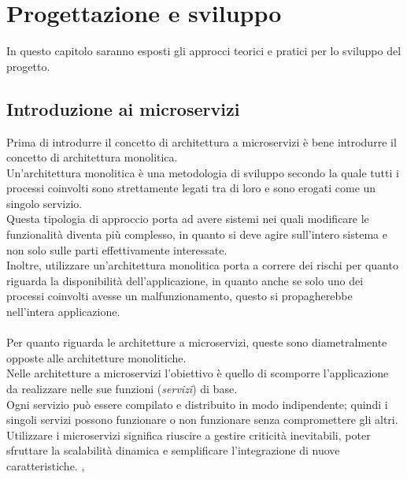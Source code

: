 \chapter{Progettazione e sviluppo}\label{chapter:progettazionesviluppo}
In questo capitolo saranno esposti gli approcci teorici e pratici per lo sviluppo del progetto.


\section{Introduzione ai microservizi}\label{sec:microserviziintro}
Prima di introdurre il concetto di architettura a microservizi è bene introdurre il concetto di architettura monolitica.\\
Un'architettura monolitica è una metodologia di sviluppo secondo la quale tutti i processi coinvolti sono strettamente legati tra di loro e sono erogati 
come un singolo servizio.\\
Questa tipologia di approccio porta ad avere sistemi nei quali modificare le funzionalità diventa più complesso, in quanto si deve agire sull'intero sistema e non 
solo sulle parti effettivamente interessate.\\
Inoltre, utilizzare un'architettura monolitica porta a correre dei rischi per quanto riguarda la disponibilità dell'applicazione, in quanto anche se solo uno dei 
processi coinvolti avesse un malfunzionamento, questo si propagherebbe nell'intera applicazione.\\ \\
Per quanto riguarda le architetture a microservizi, queste sono diametralmente opposte alle architetture monolitiche.\\
Nelle architetture a microservizi l'obiettivo è quello di scomporre l'applicazione da realizzare nelle sue funzioni (\emph{servizi}) di base.\\
Ogni servizio può essere compilato e distribuito in modo indipendente; quindi i singoli servizi possono funzionare o non funzionare senza compromettere gli altri.\\
Utilizzare i microservizi significa riuscire a gestire criticità inevitabili, poter sfruttare la scalabilità dinamica e semplificare l'integrazione 
di nuove caratteristiche. \cite{RedHatMicroservices}, \cite{Amazon}\\

